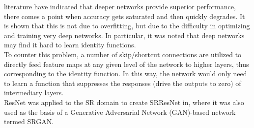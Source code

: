 \begin{enumerate}
    literature have indicated that deeper networks provide superior performance, there
    comes a point when accuracy gets saturated and then quickly degrades. It is shown that
    this is not due to overfitting, but due to the difficulty in optimizing and training very
    deep networks. In particular, it was noted that deep networks may find it hard to learn
    identity functions.\\
    To counter this problem, a number of skip/shortcut connections are utilized to
    directly feed feature maps at any given level of the network to higher layers, thus
    corresponding to the identity function. In this way, the network would only need to
    learn a function that suppresses the responses (drive the outputs to zero) of intermediary
    layers. \\
    ResNet was applied to the SR domain to create SRResNet in, where it was also used as
    the basis of a Generative Adversarial Network (GAN)-based network termed SRGAN. 
\end{enumerate}
